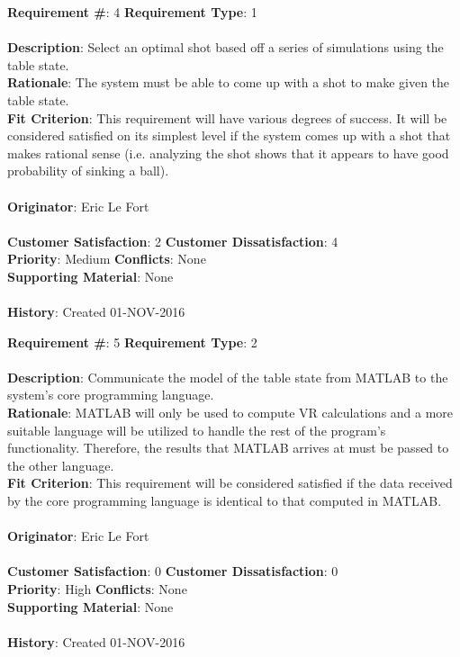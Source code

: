 \documentclass[titlepage]{article}
\begin{document}
\begin{framed}
	\noindent\textbf{Requirement \#}: 4 \hfill \textbf{Requirement Type}: 1 \hfill\\\\
	\noindent\textbf{Description}: Select an optimal shot based off a series of simulations using the table state.\\
	\textbf{Rationale}: The system must be able to come up with a shot to make given the table state.\\
	\textbf{Fit Criterion}: This requirement will have various degrees of success. It will be considered satisfied on its simplest level if the system comes up with a shot that makes rational sense (i.e. analyzing the shot shows that it appears to have good probability of sinking a ball).\\\\
	\textbf{Originator}: Eric Le Fort\\\\
	\noindent\textbf{Customer Satisfaction}: 2 \hfill 	\textbf{Customer Dissatisfaction}: 4 \hfill\\
	\textbf{Priority}: Medium \hfill \textbf{Conflicts}: None \hfill\\
	\textbf{Supporting Material}: None\\\\
	\noindent\textbf{History}: Created 01-NOV-2016
\end{framed}

\begin{framed}
	\noindent\textbf{Requirement \#}: 5 \hfill \textbf{Requirement Type}: 2 \hfill\\\\
	\noindent\textbf{Description}: Communicate the model of the table state from MATLAB to the system's core programming language.\\
	\textbf{Rationale}: MATLAB will only be used to compute VR calculations and a more suitable language will be utilized to handle the rest of the program's functionality. Therefore, the results that MATLAB arrives at must be passed to the other language.\\
	\textbf{Fit Criterion}: This requirement will be considered satisfied if the data received by the core programming language is identical to that computed in MATLAB.\\\\
	\textbf{Originator}: Eric Le Fort\\\\
	\noindent\textbf{Customer Satisfaction}: 0 \hfill 	\textbf{Customer Dissatisfaction}: 0 \hfill\\
	\textbf{Priority}: High \hfill \textbf{Conflicts}: None \hfill\\
	\textbf{Supporting Material}: None\\\\
	\noindent\textbf{History}: Created 01-NOV-2016
\end{framed}
\end{document}
